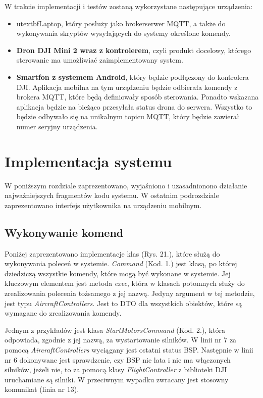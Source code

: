 W trakcie implementacji i testów zostaną wykorzystane następujące urządzenia:
  \begin{itemize}
  \item utextbf{Laptop}, który posłuży jako brokerserwer MQTT, a także do wykonywania skryptów wysyłających do systemy określone komendy.
  \item \textbf{Dron DJI Mini 2 wraz z kontrolerem}, czyli produkt docelowy, którego sterowanie ma umożliwiać zaimplementowany system.
  \item \textbf{Smartfon z systemem Android}, który będzie podłączony do kontrolera DJI. Aplikacja mobilna na tym urządzeniu będzie odbierała komendy z brokera MQTT, które będą definiowały sposób sterowania. Ponadto wskazana aplikacja będzie na bieżąco przesyłała status drona do serwera. Wszystko to będzie odbywało się na unikalnym topicu MQTT, który będzie zawierał numer seryjny urządzenia.
  \end{itemize}


\clearpage
\newpage
\section{Implementacja systemu}
W poniższym rozdziale zaprezentowano, wyjaśniono i uzasadnionono działanie najważniejszych fragmentów kodu systemu. W ostatnim podrozdziale zaprezentowano interfejs użytkownika na urządzeniu mobilnym.

\subsection{Wykonywanie komend}

Poniżej zaprezentowano implementacje klas (Rys. 21.), które służą do wykonywania poleceń w systemie. \textit{Command} (Kod. 1.) jest klasą, po której dziedziczą wszystkie komendy, które mogą być wykonane w systemie. Jej kluczowym elementem jest metoda \textit{exec}, która w klasach potomnych służy do zrealizowania polecenia tożsamego z jej nazwą. Jedyny argument w tej metodzie, jest typu \textit{AircraftControllers}. Jest to DTO dla wszystkich obiektów, które są wymagane do zrealizowania komendy.

Jednym z przykładów jest klasa \textit{StartMotorsCommand} (Kod. 2.), która odpowiada, zgodnie z jej nazwą, za wystartowanie silników. W linii nr 7 za pomocą \textit{AircraftControllers} wyciągany jest ostatni status BSP. Następnie w linii nr 6 dokonywane jest sprawdzenie, czy BSP nie lata i nie ma włączonych silników, jeżeli nie, to za pomocą klasy \textit{FlightController} z biblioteki DJI uruchamiane są silniki. W przeciwnym wypadku zwracany jest stosowny komunikat (linia nr 13).



